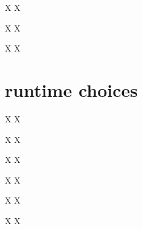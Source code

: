 \documentclass[hide notes,intlimits,usenames,dvipsnames]{beamer}
\begin{document}
\begin{frame}{X}
X
\end{frame}

\begin{frame}{X}
X
\end{frame}

\begin{frame}{X}
X
\end{frame}


\section{runtime choices}

\begin{frame}{X}
X
\end{frame}

\begin{frame}{X}
X
\end{frame}

\begin{frame}{X}
X
\end{frame}

\begin{frame}{X}
X
\end{frame}

\begin{frame}{X}
X
\end{frame}

\begin{frame}{X}
X
\end{frame}
\end{document}

